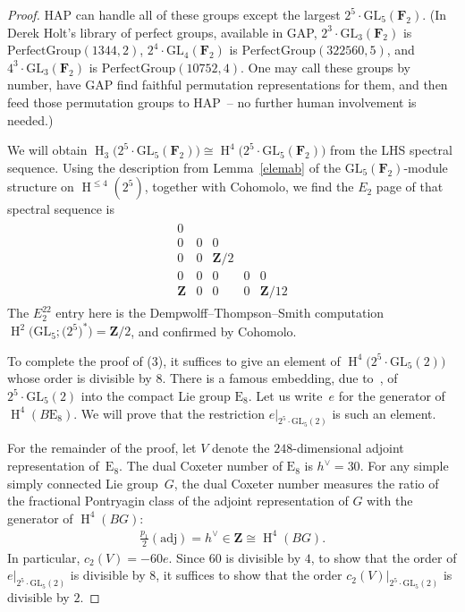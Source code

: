 \documentclass[pdftex]{sigma}
\numberwithin{equation}{section}
\newcommand\bF{\mathbf F}
\newcommand\bZ{\mathbf Z}
\newcommand\rE{\mathrm E}
\DeclareMathOperator\homology{H}
\renewcommand\H{\homology}
\newcommand\<\langle
\renewcommand\>\rangle
\newcommand{\GL}{\mathrm{GL}}
\begin{document}
\begin{proof}HAP can handle all of these groups except the largest $2^5 \cdot \GL_5(\bF_2)$. (In Derek Holt's library of perfect groups, available in GAP, $2^3 \cdot \GL_3(\bF_2)$ is $\mathrm{PerfectGroup}(1344,2)$, $2^4 \cdot \GL_4(\bF_2)$ is $\mathrm{PerfectGroup}(322560,5)$, and $4^3 \cdot \GL_3(\bF_2)$ is $\mathrm{PerfectGroup}(10752,4)$. One may call these groups by number, have GAP find faithful permutation representations for them, and then feed those permutation groups to HAP~-- no further human involvement is needed.)

We will obtain $\H_3\big(2^5 \cdot \GL_5(\bF_2)\big) \cong \H^4\big(2^5 \cdot \GL_5(\bF_2)\big)$ from the LHS spectral sequence. Using the description from Lemma~\ref{elemab} of the $\GL_5(\bF_2)$-module structure on $\H^{\leq 4}(2^5)$, together with Cohomolo, we find the $E_2$ page of that spectral sequence is
\begin{gather*}
\begin{array}{ccccc}
 0 \\
 0 & 0 & 0 \\
 0 & 0 & \bZ/2 \\
 0 & 0 & 0 & 0 & 0 \\
 \bZ & 0 & 0 & 0 & \bZ/12
\end{array}
\end{gather*}
The $E_2^{22}$ entry here is the Dempwolff--Thompson--Smith computation $\H^2\big(\GL_5;\big(2^5\big)^*\big) = \bZ/2$, and confirmed by Cohomolo.

To complete the proof of (3), it suffices to give an element of $\H^4\big(2^5 \cdot \GL_5(2)\big)$ whose order is divisible by $8$.
There is a famous embedding, due to~\cite{MR0407149}, of $2^5 \cdot \GL_5(2)$ into the compact Lie group $\rE_8$.
Let us write~$e$ for the generator of $\H^4(B\rE_8)$. We will prove that the restriction $e|_{2^5 \cdot \GL_5(2)}$ is such an element.

For the remainder of the proof, let $V$ denote the $248$-dimensional adjoint representation of~$\rE_8$. The dual Coxeter number of $\rE_8$ is $h^\vee = 30$.
For any simple simply connected Lie group~$G$, the dual Coxeter number measures the ratio of the fractional Pontryagin class of the adjoint representation of $G$ with the generator of $\H^4(BG)$: \begin{gather*}\tfrac{p_1}2(\text{adj}) = h^\vee \in \bZ \cong \H^4(BG).\end{gather*}
In particular, $c_2(V) = - 60 e$. Since $60$ is divisible by $4$, to show that the order of $e|_{2^5 \cdot \GL_5(2)}$ is divisible by $8$, it suffices to show that the order $c_2(V)|_{2^5 \cdot \GL_5(2)}$ is divisible by $2$.


\end{proof}
\end{document}
